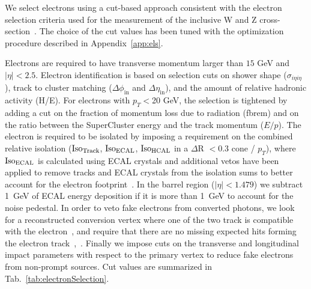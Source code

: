 We select electrons using a cut-based approach consistent with the electron 
selection criteria used for the measurement of the inclusive W and Z 
cross-section~\cite{VBTFCrossSectionNote}. 
The choice of the cut values has been tuned with the optimization procedure described in Appendix~\ref{app:els}.

Electrons are required to have transverse momentum larger than $15$ GeV and $|\eta| < 2.5$. 
Electron identification is based on selection cuts on shower shape ($\sigma_{i\eta i\eta}$), 
track to cluster matching ($\Delta \phi_{\mathrm{in}}$ and $\Delta \eta_{\mathrm{in}}$), and the amount 
of relative hadronic activity (H/E). 
For electrons with $p_T<$20 GeV, the selection is tightened by adding a cut on the fraction of momentum 
loss due to radiation (fbrem) and on the ratio between the SuperCluster energy and the track momentum ($E/p$).
The electron is required to be isolated by imposing a requirement on the combined relative isolation 
($\rm{Iso}_{Track}$, $\rm{Iso}_{ECAL}$, $\rm{Iso}_{HCAL}$ in a $\Delta$R $< 0.3$ cone / $p_{T}$), 
where $\rm{Iso}_{ECAL}$ is calculated using ECAL crystals and additional vetos have been 
applied to remove tracks and ECAL crystals from the isolation sums to better account for 
the electron footprint~\cite{ElIso}. In the barrel region ($|\eta| < 1.479$) we subtract 1~GeV of 
ECAL energy deposition if it is more than 1~GeV to account for the noise pedestal. 
In order to veto fake electrons from converted photons, we look for a reconstructed conversion vertex where 
one of the two track is compatible with the electron~\cite{ConversionNote}, 
and require that there are no missing expected hits forming the electron track~\cite{ConversionNote},~\cite{NExpHits}. 
Finally we impose cuts on the transverse and longitudinal impact parameters with
respect to the primary vertex to reduce fake electrons from non-prompt
sources. Cut values are summarized in Tab.~\ref{tab:electronSelection}.

